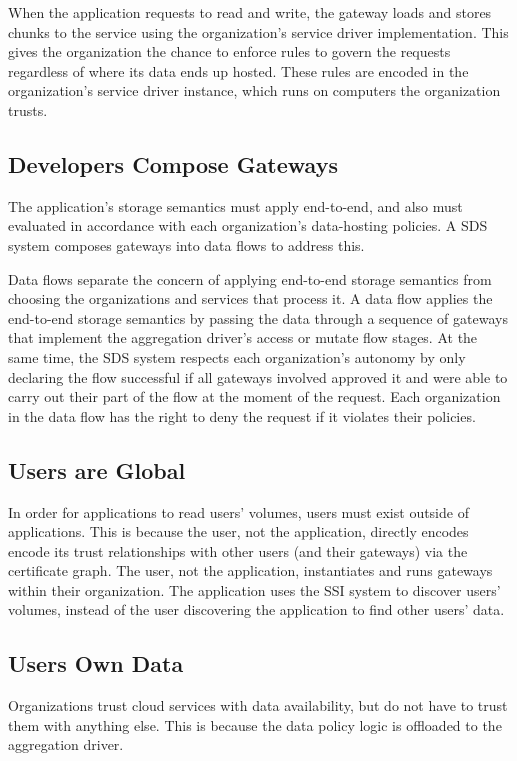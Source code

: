 When the application requests to read and write, the
gateway loads and stores chunks to the service using the organization's
service driver implementation.  This gives the organization the chance to
enforce rules to govern the requests regardless of where its data
ends up hosted.  These rules are encoded in the organization's service driver
instance, which runs on computers the organization trusts.

\subsection{Developers Compose Gateways}

The application's storage semantics must apply end-to-end, and also must 
evaluated in accordance with each organization's data-hosting policies.
A SDS system composes gateways into data flows to address this.

Data flows separate the concern of applying end-to-end storage semantics from 
choosing the organizations and services that process it.  A data flow applies
the end-to-end storage semantics by passing the data through a sequence of
gateways that implement the aggregation driver's access or mutate flow stages.
At the same time, the SDS system respects each organization's autonomy by
only declaring the flow successful if all gateways involved approved it
and were able to carry out their part of the flow at the moment of the request.
Each organization in the data flow has the right to deny the request if it
violates their policies.

\subsection{Users are Global}

In order for applications to read users' volumes, users must exist outside of
applications.  This is because the user, not the application, directly encodes
encode its trust relationships with other users (and their gateways) via the
certificate graph.  The user, not the application, instantiates and runs
gateways within their organization.  The application uses the SSI system to
discover users' volumes, instead of the user discovering the application to find
other users' data.

\subsection{Users Own Data}

Organizations trust cloud services with data availability, but do not have to
trust them with anything else.  This is because the data policy logic is
offloaded to the aggregation driver.

